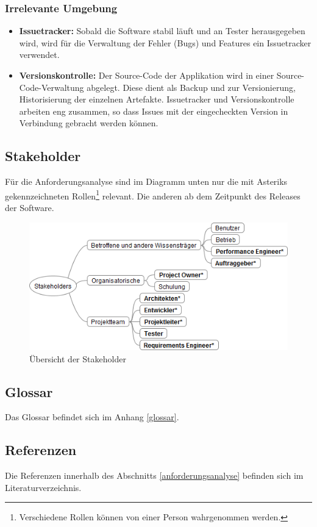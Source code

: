 \subsubsection{Irrelevante Umgebung}
\begin{itemize}
	\item \textbf{Issuetracker:} Sobald die Software stabil läuft und an Tester herausgegeben wird, wird für die Verwaltung der Fehler (Bugs) und Features ein Issuetracker verwendet.
	\item \textbf{Versionskontrolle:} Der Source-Code der Applikation wird in einer Source-Code-Verwaltung abgelegt. Diese dient als Backup und zur Versionierung, Historisierung der einzelnen Artefakte. Issuetracker und Versionskontrolle arbeiten eng zusammen, so dass Issues mit der eingecheckten Version in Verbindung gebracht werden können.
\end{itemize}


\subsection{Stakeholder}
Für die Anforderungsanalyse sind im Diagramm unten nur die mit Asteriks gekennzeichneten Rollen\footnote{Verschiedene Rollen können von einer Person wahrgenommen werden.} relevant. Die anderen ab dem Zeitpunkt des Releases der Software.


\begin{figure}[H]
  	\centering
    	\includegraphics[width=13cm]{images/stakeholder_analyse}
        	\caption{Übersicht der Stakeholder}
\end{figure}

\subsection{Glossar}
Das Glossar befindet sich im Anhang \ref{glossar}. 
\subsection{Referenzen}
Die Referenzen innerhalb des Abschnitts \ref{anforderungsanalyse} befinden sich im Literaturverzeichnis.
